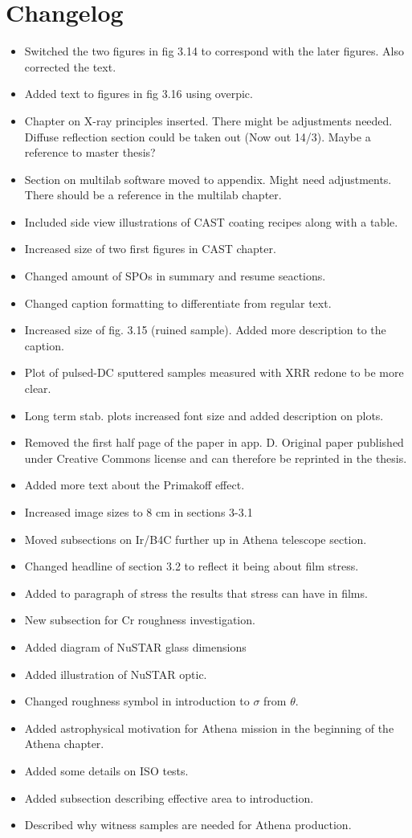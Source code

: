 \chapter{Changelog}

\begin{itemize}
  \item Switched the two figures in fig 3.14 to correspond with the later figures. Also corrected the text.
  \item Added text to figures in fig 3.16 using overpic.
  \item Chapter on X-ray principles inserted. There might be adjustments needed. Diffuse reflection section could be taken out (Now out 14/3). Maybe a reference to master thesis?
  \item Section on multilab software moved to appendix. Might need adjustments. There should be a reference in the multilab chapter.
  \item Included side view illustrations of CAST coating recipes along with a table.
  \item Increased size of two first figures in CAST chapter.
  \item Changed amount of SPOs in summary and resume seactions.
  \item Changed caption formatting to differentiate from regular text.
  \item Increased size of fig. 3.15 (ruined sample). Added more description to the caption.
  \item Plot of pulsed-DC sputtered samples measured with XRR redone to be more clear.
  \item Long term stab. plots increased font size and added description on plots.
  \item Removed the first half page of the paper in app. D. Original paper published under Creative Commons license and can therefore be reprinted in the thesis.
  \item Added more text about the Primakoff effect.
  \item Increased image sizes to 8 cm in sections 3-3.1
  \item Moved subsections on Ir/B4C further up in Athena telescope section.
  \item Changed headline of section 3.2 to reflect it being about film stress.
  \item Added to paragraph of stress the results that stress can have in films.
  \item New subsection for Cr roughness investigation.
  \item Added diagram of NuSTAR glass dimensions
  \item Added illustration of NuSTAR optic.
  \item Changed roughness symbol in introduction to $\sigma$ from $\theta$.
  \item Added astrophysical motivation for Athena mission in the beginning of the Athena chapter.
  \item Added some details on ISO tests.
  \item Added subsection describing effective area to introduction.
  \item Described why witness samples are needed for Athena production.
\end{itemize}

